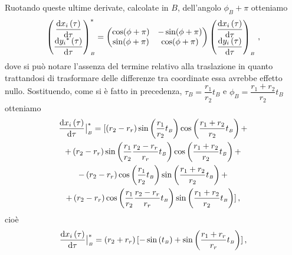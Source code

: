 \noindent Ruotando queste ultime derivate, calcolate in $B$, dell'angolo
$\phi_{\scriptscriptstyle B}+\pi$  otteniamo
\begin{equation}
\begin{pmatrix}
\dfrac{{\rm d}{x_i}\left(\tau\right)}{{\rm d}\tau}
\\
\dfrac{{\rm d}{y_i}^*\left(\tau\right)}{{\rm d}\tau}
\end{pmatrix}^*_{\scriptscriptstyle B}
 =
\begin{pmatrix} \cos(\phi + \pi) &-\sin(\phi + \pi)\\
		 \sin(\phi + \pi) &\cos(\phi + \pi) \end{pmatrix}
\begin{pmatrix}
\dfrac{{\rm d}{x_i}\left(\tau\right)}{{\rm d}\tau}
\\
\dfrac{{\rm d}{y_i}\left(\tau\right)}{{\rm d}\tau}
\end{pmatrix}_{\scriptscriptstyle B}\,,
\label{eq:derivata_ruotata}
\end{equation}
\noindent dove si pu\`o notare l'assenza del termine relativo
 alla traslazione in quanto trattandosi di trasformare delle 
differenze tra coordinate essa avrebbe effetto nullo.
Sostituendo, come si \`e fatto in precedenza,
$\tau_{\scriptscriptstyle B} = {\dfrac{r_1}{r_2}}t_{\scriptscriptstyle B}$ e
$\phi_{\scriptscriptstyle B}={\dfrac{r_1+r_2}{r_2}}t_{\scriptscriptstyle B}$
otteniamo
\begin{multline}
\dfrac{{\rm d}{x_i}\left(\tau\right)}{{\rm d}\tau}\bigr|^*_{\scriptscriptstyle B} = 
[\left(r_2-r_r\right)\sin\left(\dfrac{r_1}{r_2}t_{\scriptscriptstyle B}\right)
\cos\left(\dfrac{r_1+r_2}{r_2}t_{\scriptscriptstyle B}\right) + \\ +
\left(r_2-r_r\right)\sin\left(\dfrac{r_1}{r_2}\dfrac{r_2-r_r}{r_r}t_{\scriptscriptstyle B}\right)
\cos\left(\dfrac{r_1+r_2}{r_2}t_{\scriptscriptstyle B}\right) + \\ -
\left(r_2-r_r\right)\cos\left(\dfrac{r_1}{r_2}t_{\scriptscriptstyle B}\right)
\sin\left(\dfrac{r_1+r_2}{r_2}t_{\scriptscriptstyle B}\right) + \\ +
\left(r_2-r_r\right)\cos\left(\dfrac{r_1}{r_2}\dfrac{r_2-r_r}{r_r}t_{\scriptscriptstyle B}\right)
\sin\left(\dfrac{r_1+r_2}{r_2}t_{\scriptscriptstyle B}\right)]\,,
\label{eq:dx_in_t}
\end{multline}
\noindent cio\`e
\begin{equation}
\dfrac{{\rm d}{x_i}\left(\tau\right)}{{\rm d}\tau}\bigr|^*_{\scriptscriptstyle B} = 
\left(r_2+r_r\right)[-\sin\left(t_{\scriptscriptstyle B}\right) +
\sin\left(\dfrac{r_1+r_r}{r_r}t_{\scriptscriptstyle B}\right)]\,,
\label{eq:dx}
\end{equation}
